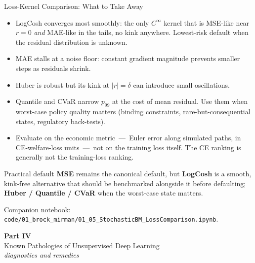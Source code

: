 \documentclass[aspectratio=169,11pt]{beamer}
\newcommand{\emphc}[1]{\textcolor{harvardcrimson}{#1}}
\begin{document}
\begin{frame}{Loss-Kernel Comparison: What to Take Away}
\scriptsize
\begin{itemize}\itemsep1.5pt
    \item \emphc{LogCosh converges most smoothly:} the only $C^\infty$ kernel that is MSE-like near $r=0$ \emph{and} MAE-like in the tails, no kink anywhere.  Lowest-risk default when the residual distribution is unknown.
    \item \emphc{MAE stalls} at a noise floor: constant gradient magnitude prevents smaller steps as residuals shrink.
    \item \emphc{Huber is robust} but its kink at $|r|{=}\delta$ can introduce small oscillations.
    \item \emphc{Quantile and CVaR} narrow $p_{99}$ at the cost of mean residual.  Use them when worst-case policy quality matters (binding constraints, rare-but-consequential states, regulatory back-tests).
    \item \emphc{Evaluate on the economic metric}~---~Euler error along simulated paths, in CE-welfare-loss units~---~not on the training loss itself.  The CE ranking is generally not the training-loss ranking.
\end{itemize}

\vspace{0.4em}
\begin{exampleblock}{Practical default}
\textbf{MSE} remains the canonical default, but \textbf{LogCosh} is a smooth, kink-free alternative that should be benchmarked alongside it before defaulting; \textbf{Huber / Quantile / CVaR} when the worst-case state matters.
\end{exampleblock}

\vspace{0.2em}
{\scriptsize Companion notebook: \texttt{code/01\_brock\_mirman/01\_05\_StochasticBM\_LossComparison.ipynb}.}
\end{frame}


\begin{frame}{}
\vfill
\begin{center}
{\Huge \textcolor{uzhblue}{\textbf{Part IV}}}\\[12pt]
{\LARGE Known Pathologies of Unsupervised Deep Learning}\\[10pt]
{\normalsize\itshape diagnostics and remedies}
\end{center}
\vfill
\end{frame}
\end{document}
